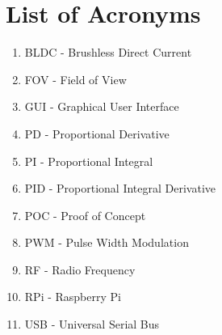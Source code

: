 \section{List of Acronyms}
\begin{enumerate}
	\item BLDC - Brushless Direct Current
	\item FOV - Field of View
	\item GUI - Graphical User Interface
	\item PD - Proportional Derivative
	\item PI - Proportional Integral
	\item PID - Proportional Integral Derivative
	\item POC - Proof of Concept
	\item PWM - Pulse Width Modulation
	\item RF - Radio Frequency
	\item RPi - Raspberry Pi
	\item USB - Universal Serial Bus
\end{enumerate}
